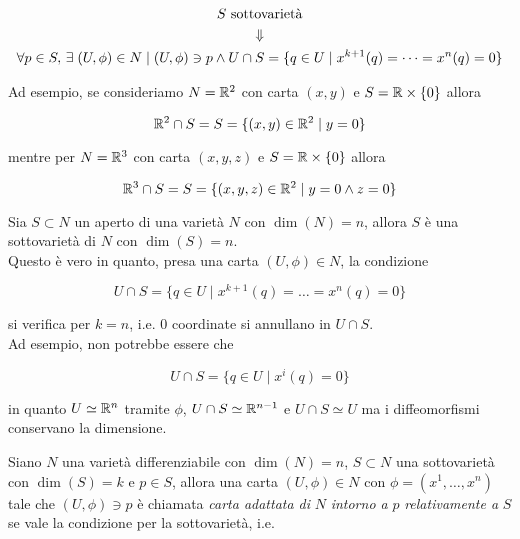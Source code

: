 \begin{gather}
	S \text{ sottovarietà}\nonumber\\
	\Downarrow\\
	\forall p \in S, \, \exists \; (U,\phi) \in N \mid (U,\phi) \ni p \wedge U \cap S = \{ q \in U \mid x^{k+1}(q) = \dots = x^{n}(q) = 0 \}\nonumber
\end{gather}

Ad esempio, se consideriamo $ N = \mathbb{R}^{2} $ con carta $ (x,y) $ e $ S = \mathbb{R} \times \{0\} $ allora

\begin{equation}
	\mathbb{R}^{2} \cap S = S = \{ (x,y) \in \mathbb{R}^{2} \mid y=0 \}
\end{equation}

mentre per $ N = \mathbb{R}^{3} $ con carta $ (x,y,z) $ e $ S = \mathbb{R} \times \{0\} $ allora

\begin{equation}
	\mathbb{R}^{3} \cap S = S = \{ (x,y,z) \in \mathbb{R}^{2} \mid y=0 \wedge z=0 \}
\end{equation}

\begin{remark}\label{subvar-open}
	Sia $ S \subset N $ un aperto di una varietà $ N $ con $ \dim(N)=n $, allora $ S $ è una sottovarietà di $ N $ con $ \dim(S)=n $.\\
	Questo è vero in quanto, presa una carta $ (U,\phi) \in N $, la condizione
	
	\begin{equation}
		U \cap S = \{ q \in U \mid x^{k+1}(q) = \dots = x^{n}(q) = 0 \}
	\end{equation}

	si verifica per $ k=n $, i.e. 0 coordinate si annullano in $ U \cap S $.\\
	Ad esempio, non potrebbe essere che
	
	\begin{equation}
		U \cap S = \{ q \in U \mid x^{i}(q) = 0 \}
	\end{equation}

	in quanto $ U \simeq \mathbb{R}^{n} $ tramite $ \phi $, $ U \cap S \simeq \mathbb{R}^{n-1} $ e $ U \cap S \simeq U $ ma i diffeomorfismi conservano la dimensione.
\end{remark}

Siano $ N $ una varietà differenziabile con $ \dim(N)=n $, $ S \subset N $ una sottovarietà con $ \dim(S)=k $ e $ p \in S $, allora una carta $ (U,\phi) \in N $ con $ \phi = (x^{1},\dots,x^{n}) $ tale che $ (U,\phi) \ni p $ è chiamata \textit{carta adattata di} $ N $ \textit{intorno a} $ p $ \textit{relativamente a} $ S $ se vale la condizione per la sottovarietà, i.e.


